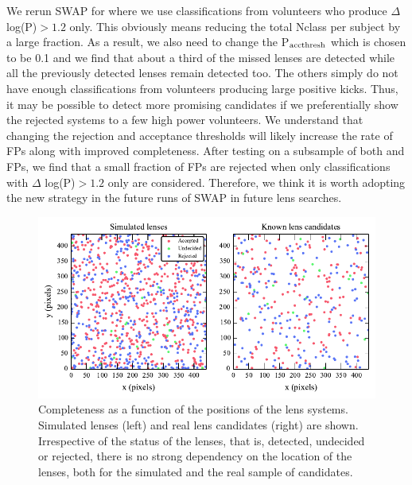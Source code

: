 \documentclass[useAMS,usenatbib,a4paper]{mn2e}
\begin{document}
We rerun SWAP for \StageOne where we use classifications from volunteers
who produce $\Delta$ log(P)$>1.2$ only. This obviously means reducing
the total Nclass per subject by a large fraction. As a result, we also
need to change the P$_{\rm acc thresh}$ which is chosen to be 0.1 and we
find that about a third of the missed lenses are detected while all the
previously detected lenses remain detected too. The others simply do not
have enough classifications from volunteers producing large positive
kicks. Thus, it may be possible to detect more promising candidates if
we preferentially show the rejected systems to a few high power
volunteers. We understand that changing the rejection and acceptance
thresholds will likely increase the rate of FPs along with improved
completeness. After testing on a subsample of both \StageOne and
\StageOne FPs, we find that a small fraction of FPs are rejected when
only classifications with $\Delta$ log(P)$>1.2$ only are considered.
Therefore, we think it is worth adopting the new strategy in the future
runs of SWAP in future lens searches.

\begin{figure}
\begin{center}
\includegraphics[scale=0.95]{sw-cfhtls-figs/completeness_pos.pdf}
\caption{ \label{fig:comppos}
Completeness as a function of the positions of the lens systems. Simulated lenses
(left) and real lens candidates (right) are shown. Irrespective of the
status of the lenses, that is, detected, undecided or rejected, there is
no strong dependency on the location of the lenses, both for the
simulated and the real sample of candidates. }
\end{center}
\end{figure}
\end{document}
